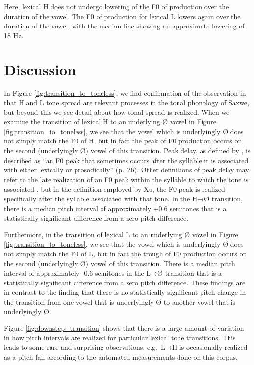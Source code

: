\documentclass[
  11pt,
  b5paper,
]{article}
\begin{document}
Here, lexical H does not undergo lowering of the F0 of production over
the duration of the vowel. The F0 of production for lexical L lowers
again over the duration of the vowel, with the median line showing an
approximate lowering of 18 Hz.

\hypertarget{discussion}{%
\section{Discussion}\label{discussion}}

In Figure \ref{fig:transition_to_toneless}, we find confirmation of the
observation in \textcite{Beavon-Ham2019Tone} that H and L tone spread
are relevant processes in the tonal phonology of Saxwe, but beyond this
we see detail about how tonal spread is realized. When we examine the
transition of lexical H to an underlying Ø vowel in Figure
\ref{fig:transition_to_toneless}, we see that the vowel which is
underlyingly Ø does not simply match the F0 of H, but in fact the peak
of F0 production occurs on the second (underlyingly Ø) vowel of this
transition. Peak delay, as defined by \textcite{xu_fundamental_2001}, is
described as ``an F0 peak that sometimes occurs after the syllable it is
associated with either lexically or prosodically'' (p.~26). Other
definitions of peak delay may refer to the late realization of an F0
peak within the syllable to which the tone is associated
\autocite{myers_tone_1999}, but in the definition employed by Xu, the F0
peak is realized specifically after the syllable associated with that
tone. In the H→Ø transition, there is a median pitch interval of
approximately +0.6 semitones that is a statistically significant
difference from a zero pitch difference.

Furthermore, in the transition of lexical L to an underlying Ø vowel in
Figure \ref{fig:transition_to_toneless}, we see that the vowel which is
underlyingly Ø does not simply match the F0 of L, but in fact the trough
of F0 production occurs on the second (underlyingly Ø) vowel of this
transition. There is a median pitch interval of approximately -0.6
semitones in the L→Ø transition that is a statistically significant
difference from a zero pitch difference. These findings are in contrast
to the finding that there is no statistically significant pitch change
in the transition from one vowel that is underlyingly Ø to another vowel
that is underlyingly Ø.

Figure \ref{fig:downstep_transition} shows that there is a large amount
of variation in how pitch intervals are realized for particular lexical
tone transitions. This leads to some rare and surprising observations;
e.g.~L→H is occasionally realized as a pitch fall according to the
automated measurements done on this corpus.
\end{document}
